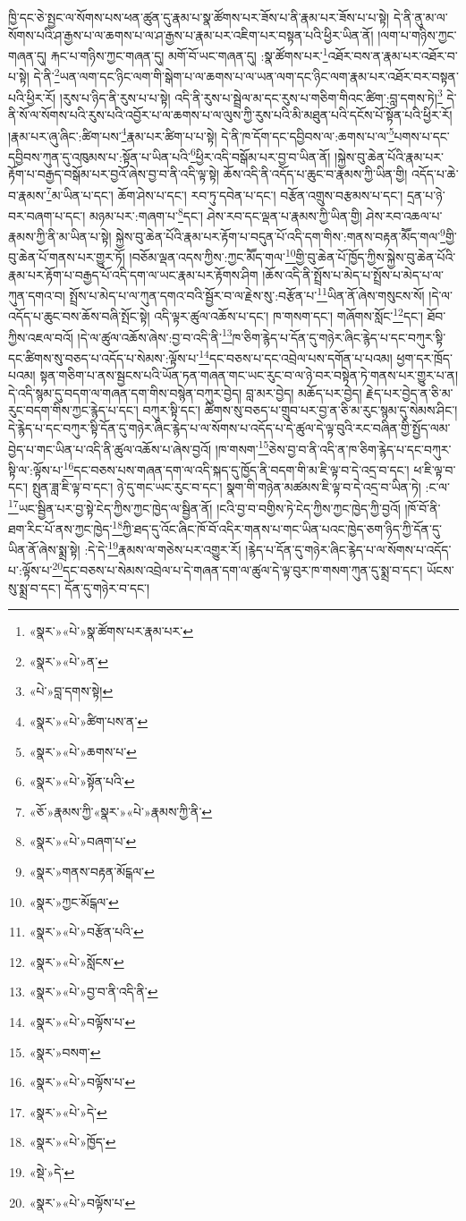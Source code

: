 ཁྱི་དང་ཅེ་སྤྱང་ལ་སོགས་པས་ཕན་ཚུན་དུ་རྣམ་པ་སྣ་ཚོགས་པར་ཟོས་པ་ནི་རྣམ་པར་ཟོས་པ་པ་སྟེ། དེ་ནི་ནུ་མ་ལ་སོགས་པའི་ཤ་རྒྱས་པ་ལ་ཆགས་པ་ལ་ཤ་རྒྱས་པ་རྣམ་པར་འཇིག་པར་བསྟན་པའི་ཕྱིར་ཡིན་ནོ། །ལག་པ་གཉིས་ཀྱང་གཞན་དུ། རྐང་པ་གཉིས་ཀྱང་གཞན་དུ། མགོ་བོ་ཡང་གཞན་དུ། :སྣ་ཚོགས་པར་\footnote{«སྣར་»«པེ་»སྣ་ཚོགས་པར་རྣམ་པར་}འཐོར་བས་ན་རྣམ་པར་འཐོར་བ་པ་སྟེ། དེ་ནི་\footnote{«སྣར་»«པེ་»ན་}ཡན་ལག་དང་ཉིང་ལག་གི་སྒེག་པ་ལ་ཆགས་པ་ལ་ཡན་ལག་དང་ཉིང་ལག་རྣམ་པར་འཐོར་བར་བསྟན་པའི་ཕྱིར་རོ། །རུས་པ་ཉིད་ནི་རུས་པ་པ་སྟེ། འདི་ནི་རུས་པ་སྦྲེལ་མ་དང་རུས་པ་གཅིག་གིའང་ཚིག་:བླ་དགས་ཏེ།\footnote{«པེ་»བླ་དགས་སྟེ།} དེ་ནི་སོ་ལ་སོགས་པའི་རུས་པའི་འབྱོར་པ་ལ་ཆགས་པ་ལ་ལུས་ཀྱི་རུས་པའི་མི་མཐུན་པའི་དངོས་པོ་སྟོན་པའི་ཕྱིར་རོ། །རྣམ་པར་ཞུ་ཞིང་:ཚིག་པས་\footnote{«སྣར་»«པེ་»ཚིག་པས་ན་}རྣམ་པར་ཚིག་པ་པ་སྟེ། དེ་ནི་ཁ་དོག་དང་དབྱིབས་ལ་:ཆགས་པ་ལ་\footnote{«སྣར་»«པེ་»ཆགས་པ་}པགས་པ་དང་དབྱིབས་ཀུན་དུ་འཁུམས་པ་:སྟོན་པ་ཡིན་པའི་\footnote{«སྣར་»«པེ་»སྟོན་པའི་}ཕྱིར་འདི་བསྒོམ་པར་བྱ་བ་ཡིན་ནོ། །སྐྱེས་བུ་ཆེན་པོའི་རྣམ་པར་རྟོག་པ་བརྒྱད་བསྒོམ་པར་བྱའོ་ཞེས་བྱ་བ་ནི་འདི་ལྟ་སྟེ། ཆོས་འདི་ནི་འདོད་པ་ཆུང་བ་རྣམས་ཀྱི་ཡིན་གྱི། འདོད་པ་ཆེ་བ་རྣམས་\footnote{«ཅོ་»རྣམས་ཀྱི་«སྣར་»«པེ་»རྣམས་ཀྱི་ནི་}མ་ཡིན་པ་དང་། ཆོག་ཤེས་པ་དང་། རབ་ཏུ་དབེན་པ་དང་། བརྩོན་འགྲུས་བརྩམས་པ་དང་། དྲན་པ་ཉེ་བར་བཞག་པ་དང་། མཉམ་པར་:གཞག་པ་\footnote{«སྣར་»«པེ་»བཞག་པ་}དང་། ཤེས་རབ་དང་ལྡན་པ་རྣམས་ཀྱི་ཡིན་གྱི། ཤེས་རབ་འཆལ་པ་རྣམས་ཀྱི་ནི་མ་ཡིན་པ་སྟེ། སྐྱེས་བུ་ཆེན་པོའི་རྣམ་པར་རྟོག་པ་བདུན་པོ་འདི་དག་གིས་:གནས་བརྟན་མཽད་གལ་\footnote{«སྣར་»གནས་བརྟན་མོངྒལ་}གྱི་བུ་ཆེན་པོ་གནས་པར་གྱུར་ཏོ། །བཅོམ་ལྡན་འདས་ཀྱིས་:ཀྱང་མཽད་གལ་\footnote{«སྣར་»ཀྱང་མོངྒལ་}གྱི་བུ་ཆེན་པོ་ཁྱོད་ཀྱིས་སྐྱེས་བུ་ཆེན་པོའི་རྣམ་པར་རྟོག་པ་བརྒྱད་པོ་འདི་དག་ལ་ཡང་རྣམ་པར་རྟོགས་ཤིག །ཆོས་འདི་ནི་སྤྲོས་པ་མེད་པ་སྤྲོས་པ་མེད་པ་ལ་ཀུན་དགའ་བ། སྤྲོས་པ་མེད་པ་ལ་ཀུན་དགའ་བའི་སྦྱོར་བ་ལ་རྗེས་སུ་:བརྩོན་པ་\footnote{«སྣར་»«པེ་»བརྩོན་པའི་}ཡིན་ནོ་ཞེས་གསུངས་སོ། །དེ་ལ་འདོད་པ་ཆུང་བས་ཆོས་བཞི་སྤོང་སྟེ། འདི་ལྟར་ཚུལ་འཆོས་པ་དང་། ཁ་གསག་དང་། གཞོགས་སློང་\footnote{«སྣར་»«པེ་»སློངས་}དང་། ཐོབ་ཀྱིས་འཇལ་བའོ། །དེ་ལ་ཚུལ་འཆོས་ཞེས་:བྱ་བ་འདི་ནི་\footnote{«སྣར་»«པེ་»བྱ་བ་ནི་འདི་ནི་}ཁ་ཅིག་རྙེད་པ་དོན་དུ་གཉེར་ཞིང་རྙེད་པ་དང་བཀུར་སྟི་དང་ཚིགས་སུ་བཅད་པ་འདོད་པ་སེམས་:ལྟོས་པ་\footnote{«སྣར་»«པེ་»བལྟོས་པ་}དང་བཅས་པ་དང་འབྲེལ་པས་དགོན་པ་པའམ། ཕྱག་དར་ཁྲོད་པའམ། སྟན་གཅིག་པ་ནས་སྦྱངས་པའི་ཡོན་ཏན་གཞན་གང་ཡང་རུང་བ་ལ་ཉེ་བར་བསྟེན་ཏེ་གནས་པར་གྱུར་པ་ན། དེ་འདི་སྙམ་དུ་བདག་ལ་གཞན་དག་གིས་བསྙེན་བཀུར་བྱེད། བླ་མར་བྱེད། མཆོད་པར་བྱེད། རྗེད་པར་བྱེད་ན་ཅི་མ་རུང་བདག་གིས་ཀྱང་རྙེད་པ་དང་། བཀུར་སྟི་དང་། ཚིགས་སུ་བཅད་པ་གྲུབ་པར་བྱ་ན་ཅི་མ་རུང་སྙམ་དུ་སེམས་ཤིང་། དེ་རྙེད་པ་དང་བཀུར་སྟི་དོན་དུ་གཉེར་ཞིང་རྙེད་པ་ལ་སོགས་པ་འདོད་པ་དེ་ཚུལ་དེ་ལྟ་བུའི་རང་བཞིན་གྱི་སྤྱོད་ལམ་བྱེད་པ་གང་ཡིན་པ་འདི་ནི་ཚུལ་འཆོས་པ་ཞེས་བྱའོ། །ཁ་གསག་\footnote{«སྣར་»བསག་}ཅེས་བྱ་བ་ནི་འདི་ན་ཁ་ཅིག་རྙེད་པ་དང་བཀུར་སྟི་ལ་:ལྟོས་པ་\footnote{«སྣར་»«པེ་»བལྟོས་པ་}དང་བཅས་པས་གཞན་དག་ལ་འདི་སྐད་དུ་ཁྱོད་ནི་བདག་གི་མ་ཇི་ལྟ་བ་དེ་འདྲ་བ་དང་། ཕ་ཇི་ལྟ་བ་དང་། སྤུན་ཟླ་ཇི་ལྟ་བ་དང་། ཉེ་དུ་གང་ཡང་རུང་བ་དང་། སྣག་གི་གཉེན་མཚམས་ཇི་ལྟ་བ་དེ་འདྲ་བ་ཡིན་ཏེ། :ང་ལ་\footnote{«སྣར་»«པེ་»དེ་}ཡང་སྦྱིན་པར་བྱ་སྟེ་ངེད་ཀྱིས་ཀྱང་ཁྱེད་ལ་སྦྱིན་ནོ། །ངའི་བྱ་བ་བགྱིས་ཏེ་ངེད་ཀྱིས་ཀྱང་ཁྱེད་ཀྱི་བྱའོ། །ཁོ་བོ་ནི་ཐག་རིང་པོ་ནས་ཀྱང་ཁྱེད་\footnote{«སྣར་»«པེ་»ཁྱོད་}ཀྱི་ཐད་དུ་འོང་ཞིང་ཁོ་བོ་འདིར་གནས་པ་གང་ཡིན་པའང་ཁྱེད་ཅག་ཉིད་ཀྱི་དོན་དུ་ཡིན་ནོ་ཞེས་སྨྲ་སྟེ། :དེ་དེ་\footnote{«སྡེ་»དེ་}རྣམས་ལ་གཅེས་པར་འགྱུར་རོ། །རྙེད་པ་དོན་དུ་གཉེར་ཞིང་རྙེད་པ་ལ་སོགས་པ་འདོད་པ་:ལྟོས་པ་\footnote{«སྣར་»«པེ་»བལྟོས་པ་}དང་བཅས་པ་སེམས་འབྲེལ་པ་དེ་གཞན་དག་ལ་ཚུལ་དེ་ལྟ་བུར་ཁ་གསག་ཀུན་དུ་སྨྲ་བ་དང་། ཡོངས་སུ་སྨྲ་བ་དང་། དོན་དུ་གཉེར་བ་དང་། 